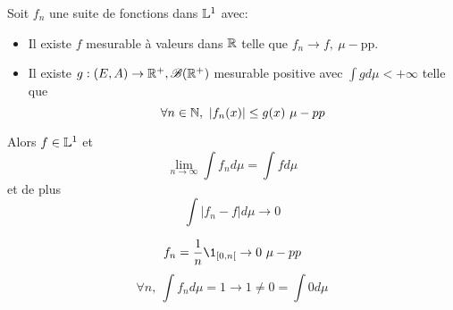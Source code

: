 \begin{theorem}
	Soit $f_n$ une suite de fonctions dans $\mathbb{L}^1$ avec:
	\begin{itemize}
		\item Il existe $f$ mesurable à valeurs dans $\mathbb{R}$ telle que $f_n \to f, \ \mu-$pp.
		\item Il existe $g : (E,A) \to \mathbb{R}^+, \mathscr{B}(\mathbb{R}^+)$ mesurable positive avec $\int g d\mu < +\infty$ telle que
		      $$\forall n \in\mathbb{N},\ |f_n(x)| \leq g(x)\ \mu-pp$$
	\end{itemize}

	Alors $f \in \mathbb{L}^1$ et
	$$\lim_{n\to \infty} \int f_n d\mu= \int f d \mu$$
	et de plus
	$$ \int |f_n - f | d \mu \to 0 $$
\end{theorem}


\begin{example}
	$$f_n =\frac{1}{n} \1_{[0,n[} \to 0 \ \mu-pp$$
	$$ \forall n, \ \int f_n d\mu = 1 \to 1 \neq 0 = \int 0 d\mu$$
\end{example}
